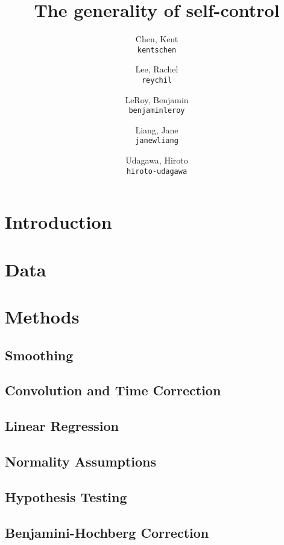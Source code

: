 \documentclass[11pt]{article}
\title{The generality of self-control}
\author{
  Chen, Kent\\
  \texttt{kentschen}
  \and
  Lee, Rachel\\
  \texttt{reychil}
  \and
  LeRoy, Benjamin\\
  \texttt{benjaminleroy}
  \and
  Liang, Jane\\
  \texttt{janewliang}
  \and
  Udagawa, Hiroto\\
  \texttt{hiroto-udagawa}
}
\begin{document}
\maketitle

\abstract{}

\section{Introduction}
	

\section{Data}

	
	
\section{Methods}
	\subsection{Smoothing}
	
		

	\subsection{Convolution and Time Correction}

		
		
	\subsection{Linear Regression}
	
		

	\subsection{Normality Assumptions}
	
		
		
	\subsection{Hypothesis Testing}
	
		

	\subsection{Benjamini-Hochberg Correction}
	
\end{document}
